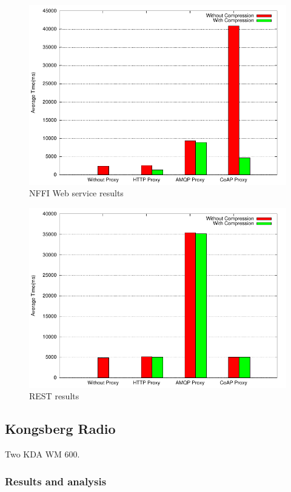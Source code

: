 \begin{figure}[H]
\center
\includegraphics[scale=0.75]{../results/edge/nffi/result.pdf}
\caption{NFFI Web service results}
\end{figure}

\begin{figure}[H]
\center
\includegraphics[scale=0.75]{../results/edge/rest/result.pdf}
\caption{REST results}
\end{figure}

\subsection{Kongsberg Radio}

Two KDA WM 600.


\subsubsection{Results and analysis}

